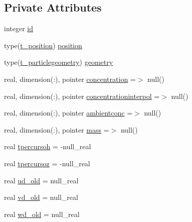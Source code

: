 \subsection*{Private Attributes}
\begin{DoxyCompactItemize}
\item 
integer \mbox{\hyperlink{structmodulelagrangianglobal_1_1t__partic_a1f94a9734f7b264f9c3606504432368e}{id}}
\item 
type(\mbox{\hyperlink{structmodulelagrangianglobal_1_1t__position}{t\+\_\+position}}) \mbox{\hyperlink{structmodulelagrangianglobal_1_1t__partic_a435a8b6139646eef681ec65aed945250}{position}}
\item 
type(\mbox{\hyperlink{structmodulelagrangianglobal_1_1t__particlegeometry}{t\+\_\+particlegeometry}}) \mbox{\hyperlink{structmodulelagrangianglobal_1_1t__partic_ac655dbf1cd865bf652a1ce4be650a39e}{geometry}}
\item 
real, dimension(\+:), pointer \mbox{\hyperlink{structmodulelagrangianglobal_1_1t__partic_a9f892f0b334f98d366395d5e88b1e1e4}{concentration}} =$>$ null()
\item 
real, dimension(\+:), pointer \mbox{\hyperlink{structmodulelagrangianglobal_1_1t__partic_af78d68a443f244c86ca0df9fe9c5aef7}{concentrationinterpol}} =$>$ null()
\item 
real, dimension(\+:), pointer \mbox{\hyperlink{structmodulelagrangianglobal_1_1t__partic_a68e8d92caa0070877e43c422bd0d577a}{ambientconc}} =$>$ null()
\item 
real, dimension(\+:), pointer \mbox{\hyperlink{structmodulelagrangianglobal_1_1t__partic_a818caed85d4ce267ba4994aa43132877}{mass}} =$>$ null()
\item 
real \mbox{\hyperlink{structmodulelagrangianglobal_1_1t__partic_a0fb65d657fdaff83eb06ee24107586a5}{tpercursoh}} = -\/null\+\_\+real
\item 
real \mbox{\hyperlink{structmodulelagrangianglobal_1_1t__partic_ac199258961c4c1546169bc4353edd9a4}{tpercursoz}} = -\/null\+\_\+real
\item 
real \mbox{\hyperlink{structmodulelagrangianglobal_1_1t__partic_a92615dd978bdff8c69108e5debc0ef29}{ud\+\_\+old}} = null\+\_\+real
\item 
real \mbox{\hyperlink{structmodulelagrangianglobal_1_1t__partic_a6b3c0e3e861171aa58f0b73905655a29}{vd\+\_\+old}} = null\+\_\+real
\item 
real \mbox{\hyperlink{structmodulelagrangianglobal_1_1t__partic_ad4b32ce3474c78dfc4008c5cd3eddfd1}{wd\+\_\+old}} = null\+\_\+real
\item 

\end{DoxyCompactItemize}
